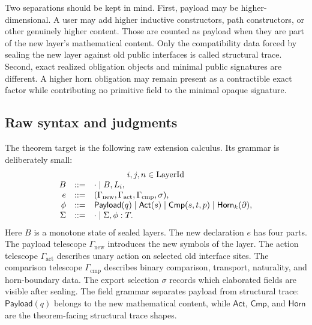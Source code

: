 \documentclass{lmcs}
\begin{document}
Two separations should be kept in mind.  First, payload may be higher-dimensional.  A user
may add higher inductive constructors, path constructors, or other genuinely higher content.
Those are counted as payload when they are part of the new layer's mathematical content.
Only the compatibility data forced by sealing the new layer against old public interfaces is
called structural trace.  Second, exact realized obligation objects and minimal public
signatures are different.  A higher horn obligation may remain present as a contractible exact
factor while contributing no primitive field to the minimal opaque signature.

\subsection{Raw syntax and judgments}

The theorem target is the following raw extension calculus.  Its grammar is deliberately
small:
\[
\begin{array}{rcl}
\multicolumn{3}{c}{i,j,n \in \mathrm{LayerId}}\\
B &::=& \cdot \mid B,L_i,\\
e &::=& (\Gamma_{\mathrm{new}},\Gamma_{\mathrm{act}},
          \Gamma_{\mathrm{cmp}},\sigma),\\
\phi &::=&
  \mathsf{Payload}(q)
  \mid \mathsf{Act}(s)
  \mid \mathsf{Cmp}(s,t,p)
  \mid \mathsf{Horn}_k(\partial),\\
\Sigma &::=& \cdot \mid \Sigma,\phi:T.
\end{array}
\]
Here \(B\) is a monotone state of sealed layers.  The new declaration \(e\) has four parts.
The payload telescope \(\Gamma_{\mathrm{new}}\) introduces the new symbols of the layer.  The
action telescope \(\Gamma_{\mathrm{act}}\) describes unary action on selected old interface
sites.  The comparison telescope \(\Gamma_{\mathrm{cmp}}\) describes binary comparison,
transport, naturality, and horn-boundary data.  The export selection \(\sigma\) records which
elaborated fields are visible after sealing.  The field grammar separates payload from
structural trace: \(\mathsf{Payload}(q)\) belongs to the new mathematical content, while
\(\mathsf{Act}\), \(\mathsf{Cmp}\), and \(\mathsf{Horn}\) are the theorem-facing structural
trace shapes.
\end{document}
